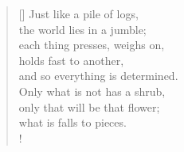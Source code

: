 \documentclass[a4paper,12pt,twoside,final]{book}
\begin{document}
\settowidth{\versewidth}{each thing constricts, presses against,}

\begin{verse}[\versewidth]
  Just like a pile of logs, \\
  the world lies in a jumble; \\
  each thing presses, weighs on, \\
  holds fast to another, \\
  and so everything is determined. \\
  Only what is not has a shrub, \\
  only that will be that flower; \\
  what is falls to pieces. \\!
\end{verse}


\newpage

\settowidth{\versewidth}{Csak ami nincs, annak van bokra,}
\end{document}
